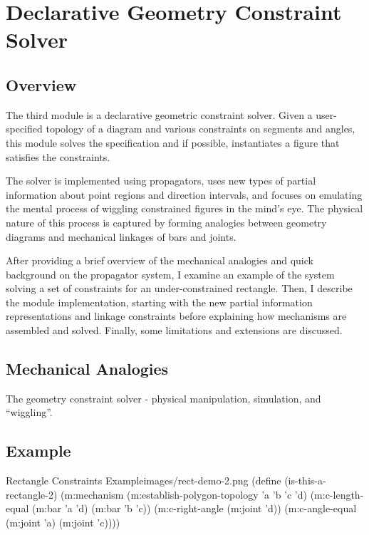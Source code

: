 \chapter{Declarative Geometry Constraint Solver}
\label{chap:declarative}

\section{Overview}

The third module is a declarative geometric constraint solver. Given a
user-specified topology of a diagram and various constraints on
segments and angles, this module solves the specification and if
possible, instantiates a figure that satisfies the constraints.

The solver is implemented using propagators, uses new types of partial
information about point regions and direction intervals, and focuses
on emulating the mental process of wiggling constrained figures in the
mind's eye. The physical nature of this process is captured by forming
analogies between geometry diagrams and mechanical linkages of bars
and joints.

After providing a brief overview of the mechanical analogies and quick
background on the propagator system, I examine an example of the
system solving a set of constraints for an under-constrained
rectangle. Then, I describe the module implementation, starting with
the new partial information representations and linkage constraints
before explaining how mechanisms are assembled and solved. Finally,
some limitations and extensions are discussed.


\section{Mechanical Analogies}

The geometry constraint solver - physical manipulation, simulation,
and ``wiggling''.

\section{Example}
\begin{code-example}{Rectangle Constraints Example}{images/rect-demo-2.png}
(define (is-this-a-rectangle-2)
  (m:mechanism
   (m:establish-polygon-topology 'a 'b 'c 'd)
   (m:c-length-equal (m:bar 'a 'd)
                     (m:bar 'b 'c))
   (m:c-right-angle (m:joint 'd))
   (m:c-angle-equal (m:joint 'a)
                    (m:joint 'c))))
\end{code-example}

